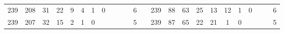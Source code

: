 {\begin{tabular}{cccccccccccclccccccccccc}
239                                                & 208                                                & 31                                               & 22                                               & 9                                                & 4                                                & 1                                               & 0                                               &                                                 &                                                 &                                                 & 6                                                &                          & 239                                                & 88                                                 & 63                                               & 25                                               & 13                                              & 12                                              & 1                                               & 0                                               &                                                 &                                                 & 6                                                \\
239                                                & 207                                                & 32                                               & 15                                               & 2                                                & 1                                                & 0                                               &                                                 &                                                 &                                                 &                                                 & 5                                                &                          & 239                                                & 87                                                 & 65                                               & 22                                               & 21                                              & 1                                               & 0                                               &                                                 &                                                 &                                                 & 5                                                \\

\end{tabular}}
